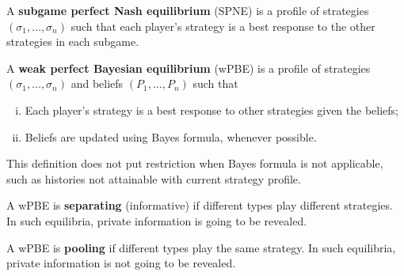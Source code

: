 \documentclass{article}
\begin{document}
   	\begin{definition}
   		A \textbf{subgame perfect Nash equilibrium} (SPNE) is a profile of strategies $\left(\sigma_{1}, \ldots, \sigma_{n}\right)$ such that each player's strategy is a best response to the other strategies in each subgame.
   	\end{definition}

   	\begin{definition}
   		A \textbf{weak perfect Bayesian equilibrium} (wPBE) is a profile of strategies $\left(\sigma_{1}, \ldots, \sigma_{n}\right)$ and beliefs $\left(P_1, \ldots, P_n\right)$ such that
   		\begin{enumerate}[(i)]
   			\item Each player's strategy is a best response to other strategies given the beliefs;
   			\item Beliefs are updated using Bayes formula, whenever possible.
   		\end{enumerate}
   	\end{definition}
   	
   	\begin{remark}
   		This definition does not put restriction when Bayes formula is not applicable, such as histories not attainable with current strategy profile.
   	\end{remark}
   	
   	\begin{definition}
   		A wPBE is \textbf{separating} (informative) if different types play different strategies. In such equilibria, private information is going to be revealed.
   	\end{definition}
   	
   	   	\begin{definition}
   		A wPBE is \textbf{pooling} if different types play the same strategy. In such equilibria, private information is not going to be revealed.
   	\end{definition}
\end{document}
